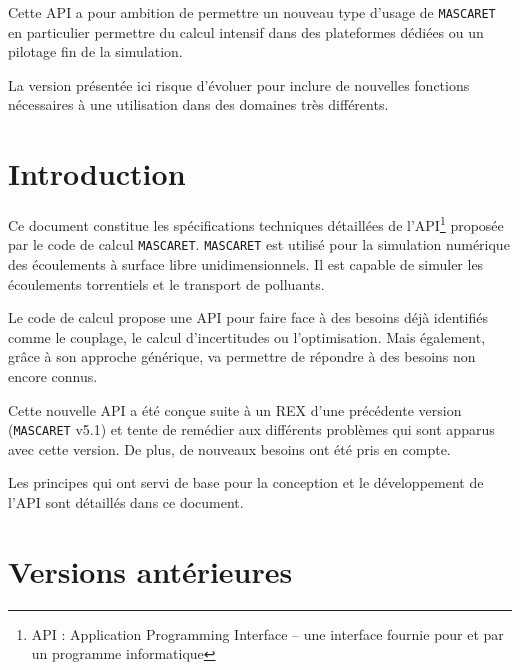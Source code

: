 \documentclass[a4paper,11pt]{article}
\begin{document}
 \vspace{0.5cm}  
 
 Cette API a pour ambition de permettre un nouveau type d'usage de \texttt{MASCARET} en particulier permettre du calcul intensif dans des plateformes d\'edi\'ees ou un pilotage fin de la simulation.
 
  \vspace{0.5cm}  
  
 La version pr\'esent\'ee ici risque d'\'evoluer pour inclure de nouvelles fonctions n\'ecessaires \`a une utilisation dans des domaines tr\`es diff\'erents. 
 
\newpage

\section{Introduction}

  Ce document constitue les sp\'ecifications techniques d\'etaill\'ees de l'API\footnote{API : Application Programming Interface -- une interface fournie pour et par un programme informatique} propos\'ee par le code de calcul \texttt{MASCARET}. \texttt{MASCARET} est utilis\'e pour la simulation num\'erique des \'ecoulements \`a surface libre unidimensionnels. Il est capable de simuler les \'ecoulements torrentiels et le transport de polluants.

 \vspace{0.5cm} 

 Le code de calcul propose une API pour faire face \`a des besoins d\'ej\`a identifi\'es comme le couplage, le calcul d'incertitudes ou l'optimisation. Mais \'egalement, gr\^ace \`a son approche g\'en\'erique, va permettre de r\'epondre \`a des besoins non encore connus.

 \vspace{0.5cm} 

 Cette nouvelle API a \'et\'e con\c{c}ue suite \`a un REX d'une pr\'ec\'edente version (\texttt{MASCARET} v5.1) et tente de rem\'edier aux diff\'erents probl\`emes qui sont apparus avec cette version. De plus, de nouveaux besoins ont \'et\'e pris en compte.

 \vspace{0.5cm}  
 
 Les principes qui ont servi de base pour la conception et le d\'eveloppement de l'API sont d\'etaill\'es dans ce document.

\section{Versions ant\'erieures}
\end{document}
